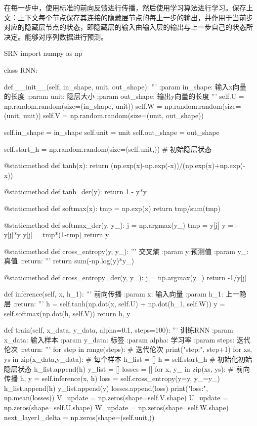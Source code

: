 \documentclass[openbib]{article}
\begin{document}
在每一步中，使用标准的前向反馈进行传播，然后使用学习算法进行学习。保存上文：上下文每个节点保存其连接的隐藏层节点的每上一步的输出，并作用于当前步对应的隐藏层节点的状态，即隐藏层的输入由输入层的输出与上一步自己的状态所决定。能够对序列数据进行预测。
\begin{Python}{SRN}
import numpy as np


class RNN:

	def __init__(self, in_shape, unit, out_shape):
		'''
		:param in_shape: 输入x向量的长度
		:param unit: 隐层大小
		:param out_shape: 输出y向量的长度
		'''
		self.U = np.random.random(size=(in_shape, unit))
		self.W = np.random.random(size=(unit, unit))
		self.V = np.random.random(size=(unit, out_shape))

		self.in_shape = in_shape
		self.unit = unit
		self.out_shape = out_shape

		self.start_h = np.random.random(size=(self.unit,))  # 初始隐层状态

@staticmethod
	def tanh(x):
		return (np.exp(x)-np.exp(-x))/(np.exp(x)+np.exp(-x))

@staticmethod
	def tanh_der(y):
		return 1 - y*y
	
@staticmethod
	def softmax(x):
		tmp = np.exp(x)
		return tmp/sum(tmp)

@staticmethod
	def softmax_der(y, y_):
		j = np.argmax(y_)
		tmp = y[j]
		y = -y[j]*y
		y[j] = tmp*(1-tmp)
		return y

@staticmethod
	def cross_entropy(y, y_):
		'''
		交叉熵
		:param y:预测值
		:param y_: 真值
		:return:
		'''
		return sum(-np.log(y)*y_)
	
@staticmethod
	def cross_entropy_der(y, y_):
		j = np.argmax(y_)
		return -1/y[j]

	def inference(self, x, h_1):
		'''
		前向传播
		:param x: 输入向量
		:param h_1: 上一隐层
		:return:
		'''
		h = self.tanh(np.dot(x, self.U) + np.dot(h_1, self.W))
		y = self.softmax(np.dot(h, self.V))
		return h, y

	def train(self, x_data, y_data, alpha=0.1, steps=100):
		'''
		训练RNN
		:param x_data: 输入样本
		:param y_data: 标签
		:param alpha: 学习率
		:param steps: 迭代伦次
		:return:
		'''
	for step in range(steps):  # 迭代伦次
		print("step:", step+1)
		for xs, ys in zip(x_data,y_data):  # 每个样本
			h_list = []
			h = self.start_h  # 初始化初始隐层状态
			h_list.append(h)
			y_list = []
			losses = []
			for x, y_ in zip(xs, ys):  # 前向传播
				h, y = self.inference(x, h)
				loss = self.cross_entropy(y=y, y_=y_)
				h_list.append(h)
				y_list.append(y)
				losses.append(loss)
			print("loss:", np.mean(losses))
			V_update = np.zeros(shape=self.V.shape)
			U_update = np.zeros(shape=self.U.shape)
			W_update = np.zeros(shape=self.W.shape)
			next_layer1_delta = np.zeros(shape=(self.unit,))


\end{Python}
\end{document}
